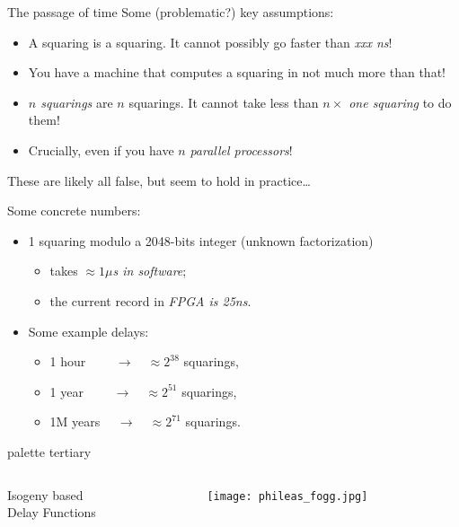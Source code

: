 \documentclass[aspectratio=169]{beamer}
\begin{document}
\begin{frame}{The passage of time}
  Some (problematic?) key assumptions:
  \begin{itemize}
  \item A squaring is a squaring. It cannot possibly go faster than \emph{xxx ns}!
  \item You have a machine that computes a squaring in not much
    more than that!
  \item \emph{$n$ squarings} are $n$ squarings. It cannot take less
    than \emph{$n \times $ one squaring} to do them!
  \item Crucially, even if you have $n$ \emph{parallel processors}!
  \end{itemize}
  These are likely all false, but seem to hold in practice\dots
  
  \medskip\pause

  Some concrete numbers:
  \begin{itemize}
  \item 1 squaring modulo a 2048-bits integer (unknown factorization)
    \begin{itemize}
    \item takes \emph{$\approx 1\mu$s in software};
    \item the current record in \emph{FPGA is 25ns}.
    \end{itemize}
  \item Some example delays:
    \begin{itemize}
    \item 1 hour $\qquad\rightarrow\quad\approx 2^{38}$ squarings,
    \item 1 year $\qquad\rightarrow\quad\approx 2^{51}$ squarings,
    \item 1M years $\quad\rightarrow\quad\approx 2^{71}$ squarings.
    \end{itemize}
  \end{itemize}
\end{frame}


\begin{frame}[plain]
  \begin{beamercolorbox}[sep=0.1px,center,wd=\paperwidth,ht=\paperheight]{palette tertiary}
    \begin{columns}
      \begin{column}{0.64\textwidth}
        \Huge\centering Isogeny based\\Delay Functions
      \end{column}
      \begin{column}{0.36\textwidth}
        \texttt{[image: phileas\_fogg.jpg]}
      \end{column}
    \end{columns}
  \end{beamercolorbox}
\end{frame}
\end{document}
